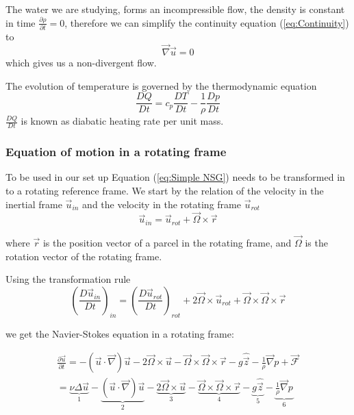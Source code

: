 \documentclass[12pt, a4paper]{article} %
\begin{document}
		The water we are studying, forms an incompressible flow, the density is constant in time %
		 $\frac{\partial\rho}{\partial t} =0 $, therefore we can simplify the continuity equation (\ref{eq:Continuity}) to
		\begin{equation}
			\vec{\nabla} \vec{u} = 0
			\label{eq:nondivergence}
		\end{equation}
		which gives us a non-divergent flow.
		
		The evolution of temperature is governed by the thermodynamic equation
		\begin{equation}
			\frac{DQ}{Dt} = c_p \frac{DT}{Dt} - \frac{1}{\rho} \frac{Dp}{Dt}
			\label{eq:Thermodyn}
		\end{equation}
		$\frac{DQ}{Dt}$ is known as diabatic heating rate per unit mass. %
		
		
		\subsubsection{Equation of motion in a rotating frame}		%
			To be used in our set up Equation (\ref{eq:Simple NSG}) needs to be transformed in to a rotating reference frame. We start by the relation of the velocity in the inertial frame $\vec{u}_{in}$ and the velocity in the rotating frame $\vec{u}_{rot}$
			\begin{equation}
				\vec{u}_{in} = \vec{u}_{rot} + \vec{\Omega}\times\vec{r}
				\label{eq:Velocity Frames}
			\end{equation}
			
			where $\vec{r}$ is the position vector of a parcel in the rotating frame, and $\vec{\Omega}$ is the rotation vector of the rotating frame.
			
			Using the transformation rule %
			\begin{equation}
				\left(\frac{D\vec{u}_{in}}{Dt}\right)_{in} = \left(\frac{D\vec{u}_{rot}}{Dt}\right)_{rot} + 2\vec{\Omega}\times\vec{u}_{rot} + \vec{\Omega}\times\vec{\Omega}\times\vec{r}
				\label{eq: Lag Dev Rot}
			\end{equation}
			
			we get the Navier-Stokes equation in a rotating frame:
			
			\begin{eqnarray}
				\frac{\partial\vec{u}}{\partial t}
				= - \left(\vec{u}\cdot\vec{\nabla}\right)\vec{u} - 2\vec{\Omega}\times\vec{u} - \vec{\Omega}\times\vec{\Omega}\times\vec{r} - g\hat{\vec{z}} - \frac{1}{\rho}\vec{\nabla}p + \vec{\mathcal{F}}
				\nonumber \\
				= \underbrace{\nu\Delta\vec{u}}_{1} - \underbrace{\left(\vec{u}\cdot\vec{\nabla}\right)\vec{u}}_{2} - \underbrace{2\vec{\Omega}\times\vec{u}}_{3}- \underbrace{\vec{\Omega}\times\vec{\Omega}\times\vec{r}}_{4} - \underbrace{g\hat{\vec{z}}}_{5} - \underbrace{\frac{1}{\rho}\vec{\nabla}p}_{6}
				\label{eq: NSG}
			\end{eqnarray}
			
\end{document}
